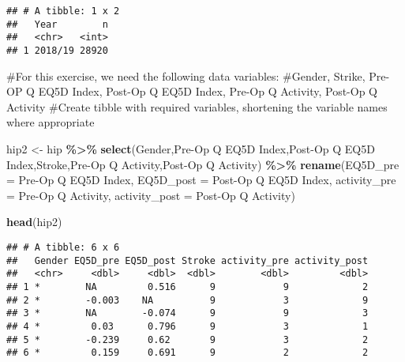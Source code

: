 \documentclass[
]{article}
\newenvironment{Shaded}{\begin{snugshade}}{\end{snugshade}}
\newcommand{\AttributeTok}[1]{\textcolor[rgb]{0.13,0.29,0.53}{#1}}
\newcommand{\FunctionTok}[1]{\textcolor[rgb]{0.13,0.29,0.53}{\textbf{#1}}}
\newcommand{\NormalTok}[1]{#1}
\newcommand{\OtherTok}[1]{\textcolor[rgb]{0.56,0.35,0.01}{#1}}
\newcommand{\SpecialCharTok}[1]{\textcolor[rgb]{0.81,0.36,0.00}{\textbf{#1}}}
\newcommand{\StringTok}[1]{\textcolor[rgb]{0.31,0.60,0.02}{#1}}
\begin{document}
\begin{verbatim}
## # A tibble: 1 x 2
##   Year        n
##   <chr>   <int>
## 1 2018/19 28920
\end{verbatim}

\#For this exercise, we need the following data variables: \#Gender,
Strike, Pre-OP Q EQ5D Index, Post-Op Q EQ5D Index, Pre-Op Q Activity,
Post-Op Q Activity \#Create tibble with required variables, shortening
the variable names where appropriate

\begin{Shaded}
\begin{Highlighting}[]
\NormalTok{hip2 }\OtherTok{\textless{}{-}}\NormalTok{ hip }\SpecialCharTok{\%\textgreater{}\%} 
  \FunctionTok{select}\NormalTok{(}\StringTok{\textquotesingle{}Gender\textquotesingle{}}\NormalTok{,}\StringTok{\textquotesingle{}Pre{-}Op Q EQ5D Index\textquotesingle{}}\NormalTok{,}\StringTok{\textquotesingle{}Post{-}Op Q EQ5D Index\textquotesingle{}}\NormalTok{,}\StringTok{\textquotesingle{}Stroke\textquotesingle{}}\NormalTok{,}\StringTok{\textquotesingle{}Pre{-}Op Q Activity\textquotesingle{}}\NormalTok{,}\StringTok{\textquotesingle{}Post{-}Op Q Activity\textquotesingle{}}\NormalTok{) }\SpecialCharTok{\%\textgreater{}\%} 
  \FunctionTok{rename}\NormalTok{(}\AttributeTok{EQ5D\_pre =} \StringTok{\textquotesingle{}Pre{-}Op Q EQ5D Index\textquotesingle{}}\NormalTok{,}
         \AttributeTok{EQ5D\_post =} \StringTok{\textquotesingle{}Post{-}Op Q EQ5D Index\textquotesingle{}}\NormalTok{,}
         \AttributeTok{activity\_pre =} \StringTok{\textquotesingle{}Pre{-}Op Q Activity\textquotesingle{}}\NormalTok{,}
         \AttributeTok{activity\_post =} \StringTok{\textquotesingle{}Post{-}Op Q Activity\textquotesingle{}}\NormalTok{)}

\FunctionTok{head}\NormalTok{(hip2)}
\end{Highlighting}
\end{Shaded}

\begin{verbatim}
## # A tibble: 6 x 6
##   Gender EQ5D_pre EQ5D_post Stroke activity_pre activity_post
##   <chr>     <dbl>     <dbl>  <dbl>        <dbl>         <dbl>
## 1 *        NA         0.516      9            9             2
## 2 *        -0.003    NA          9            3             9
## 3 *        NA        -0.074      9            9             3
## 4 *         0.03      0.796      9            3             1
## 5 *        -0.239     0.62       9            3             2
## 6 *         0.159     0.691      9            2             2
\end{verbatim}
\end{document}
